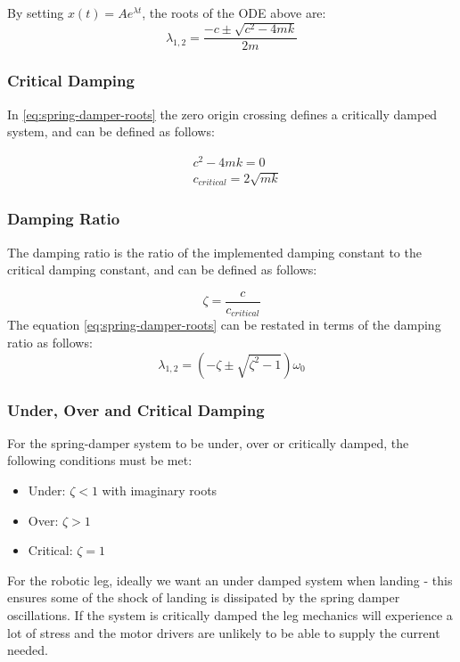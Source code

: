By setting $x(t) = Ae^{\lambda t}$, the roots of the ODE above are:
\begin{equation} \label{eq:spring-damper-roots}
\lambda_{1,2} = \frac{-c \pm \sqrt{c^2 - 4mk}}{2m}
\end{equation}

\subsubsection{Critical Damping}
In \cref{eq:spring-damper-roots} the zero origin crossing defines a critically damped system, and can be defined as follows:

\begin{equation}
\begin{aligned}
&c^2 - 4mk = 0 \\
&c_{critical} = 2\sqrt{mk}
\end{aligned}
\end{equation}

\subsubsection{Damping Ratio}

The damping ratio is the ratio of the implemented damping constant to the critical damping constant, and can be defined as follows:

\begin{equation} \label{eq:damping-ratio}
\zeta = \frac{c}{c_{critical}}
\end{equation}
The equation \cref{eq:spring-damper-roots} can be restated in terms of the damping ratio as follows:
\begin{equation}
\lambda_{1,2} = (-\zeta \pm \sqrt{\zeta^2 - 1})\omega_0
\end{equation}

\subsubsection{Under, Over and Critical Damping}
For the spring-damper system to be under, over or critically damped, the following conditions must be met:
\begin{itemize}
\item Under: $\zeta < 1$ with imaginary roots
\item Over: $\zeta > 1$ 
\item Critical: $\zeta = 1$
\end{itemize}

For the robotic leg, ideally we want an under damped system when landing - this ensures some of the shock of landing is dissipated by the spring damper oscillations. If the system is critically damped the leg mechanics will experience a lot of stress and the motor drivers are unlikely to be able to supply the current needed.

